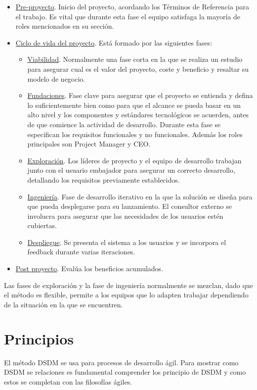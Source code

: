 \documentclass[12pt,a4paper]{article}
\begin{document}
\begin{itemize}
	\item \underline{Pre-proyecto}. Inicio del proyecto, acordando los Términos de Referencia para el trabajo. Es vital que durante esta fase el equipo satisfaga la mayoría de roles mencionados en su sección.
	\item \underline{Ciclo de vida del proyecto}. Está formado por las siguientes fases:
	\begin{itemize}
		\item \underline{Viabilidad}. Normalmente una fase corta en la que se realiza un estudio para asegurar cual es el valor del proyecto, coste y beneficio y resaltar su modelo de negocio.
		\item \underline{Fundaciones}. Fase clave para asegurar que el proyecto se entienda y defina lo suficientemente bien como para que el alcance se pueda basar en un alto nivel y los componentes y estándares tecnológicos se acuerden, antes de que comience la actividad de desarrollo. Durante esta fase se especifican los requisitos funcionales y no funcionales. Además los roles principales son Project Manager y CEO.
		\item \underline{Exploración}. Los líderes de proyecto y el equipo de desarrollo trabajan junto con el usuario embajador para asegurar un correcto desarrollo, detallando los requisitos previamente establecidos.
		\item \underline{Ingeniería}. Fase de desarrollo iterativo en la que la solución se diseña para que pueda desplegarse para su lanzamiento. El consultor externo se involucra para asegurar que las necesidades de los usuarios estén cubiertas.
		\item \underline{Despliegue}. Se presenta el sistema a los usuarios y se incorpora el feedback durante varias iteraciones.
	\end{itemize}
 	\item \underline{Post proyecto}. Evalúa los beneficios acumulados.
\end{itemize}
	
Las fases de exploración y la fase de ingeniería normalmente se mezclan, dado que el método es flexible, permite a los equipos que lo adapten trabajar dependiendo de la situación en la que se encuentren.


\section{Principios}
El método DSDM se usa para procesos de desarrollo ágil. Para mostrar como DSDM se relaciones es fundamental comprender los principio de DSDM y como estos se completan con las filosofías ágiles.\\
\end{document}
